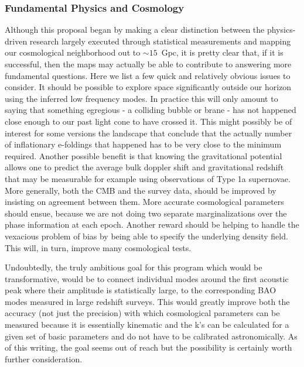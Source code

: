 \documentclass[psfig,11pt]{article}
\begin{document}
{\subsubsection{Fundamental Physics and Cosmology}

Although this proposal began by making a clear distinction between the physics-driven research largely executed through statistical measurements and mapping our cosmological neighborhood out to $\sim15$~Gpc, it is pretty clear that, if it is successful, then the maps may actually be able to contribute to answering more fundamental questions. Here we list a few quick and relatively obvious issues to consider. It should be possible to explore space significantly outside our horizon using the inferred low frequency modes. In practice this will only amount to saying that something egregious - a colliding bubble or brane - has not happened close enough to our past light cone to have crossed it. This might possibly be of interest for some versions the landscape that conclude that the actually number of inflationary e-foldings that happened has to be very close to the minimum required.  Another possible benefit is that knowing the gravitational potential allows one to predict the average bulk doppler shift and gravitational redshift that may be measurable for example using observations of Type 1a supernovae. More generally, both the CMB and the survey data, should be improved by insisting on agreement between them. More accurate cosmological parameters should ensue, because we are not doing two separate marginalizations over the phase information at each epoch. Another reward should be helping to handle the vexacious problem of bias by being able to specify the underlying density field. This will, in turn, improve many cosmological tests.

Undoubtedly, the truly ambitious goal for this program which would be transformative, would be to connect individual modes around the first acoustic peak where their amplitude is statistically large, to the corresponding BAO modes measured in large redshift surveys. This would greatly improve both the accuracy (not just the precision) with which cosmological parameters can be measured because it is essentially kinematic and the k's can be calculated for a given set of basic parameters and do not have to be calibrated astronomically. As of this writing, the goal seems out of reach but the possibility is certainly worth further consideration.


}
\end{document}
